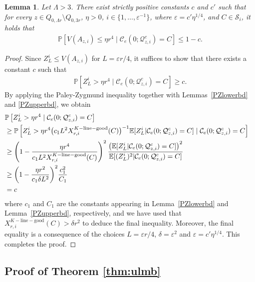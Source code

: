 \documentclass[11pt]{article}
\theoremstyle{definition}
\theoremstyle{remark}
\newcommand{\E}{\mathbb{E}}
\newcommand{\bP}{\mathbb{P}}
\numberwithin{equation}{section}
\theoremstyle{plain}
\newtheorem{lem}[theorem]{Lemma}
\theoremstyle{definition}
\theoremstyle{remark}
\theoremstyle{plain}
\begin{document}
\begin{lem}\label{Iterating} Let $\Lambda>3$. There exist strictly positive constants $c$ and $c'$ such that for every $z \in Q_{0,\Lambda r}\setminus Q_{0,3r}$, $\eta>0$, $i\in\{1,\ldots,\varepsilon^{-1}\}$, where $\varepsilon=c'\eta^{1/4}$, and $C\in\mathcal S_i$, it holds that
\begin{align*}
\bP\left[V(A_{z,i})\le \eta r^4\mid \mathcal C_e(0; \mathcal Q_{z, i}^c)=C\right]\le 1-c.
\end{align*}
\end{lem}
\begin{proof}
Since $Z_{L}^i\le V(A_{z,i})$ for $L=\varepsilon r/4$, it suffices to show that there exists a constant $c$ such that
\begin{align*}
\bP\left[Z_{L}^i> \eta r^4\mid \mathcal C_e(0; \mathcal Q_{z, i}^c)=C\right]\ge c.
\end{align*}
By applying the Paley-Zygmund inequality together with Lemmas~\ref{PZlowerbd} and \ref{PZupperbd}, we obtain
\begin{align*}
\lefteqn{\bP\left[Z_{L}^i> \eta r^4\mid \mathcal C_e(0; \mathcal Q_{z, i}^c)=C\right]}\\
 &\ge  \bP\left[Z_{L}^i> \eta r^4\big(c_1L^2X_{r,i}^{K-\mathrm{line-good}}(C)\big)^{-1}\E[Z_{L}^i|\mathcal C_e(0; \mathcal Q_{z, i}^c)=C]\mid\mathcal C_e(0; \mathcal Q_{z, i}^c)=C\right]\\
 &\ge \left(1-\frac{\eta r^4}{c_1L^2X_{r,i}^{K-\mathrm{line-good}}(C)}\right)^2\frac{\left(\E[Z_{L}^i|\mathcal C_e(0; \mathcal Q_{z, i}^c)=C]\right)^2}{\E[(Z_{L}^i)^2|\mathcal C_e(0; \mathcal Q_{z, i}^c)=C]}\\
 &\ge \bigg(1-\frac{\eta r^2}{c_1\delta L^2 }\bigg)^2\frac{c_1^2}{C_1}\\
 &=c
\end{align*}
where $c_1$ and $C_1$ are the constants appearing in Lemma~\ref{PZlowerbd} and Lemma~\ref{PZupperbd}, respectively, and we have used that  $X_{r,i}^{K-\mathrm{line-good}}(C)>\delta r^2$ to deduce the final inequality. Moreover, the final equality is a consequence of the choices $L=\varepsilon r/4$, $\delta=\varepsilon^2$ and $\varepsilon=c'\eta^{1/4}$. This completes the proof.
\end{proof}

\subsection{Proof of Theorem \ref{thm:ulmb}}\label{proofsec}
\end{document}
